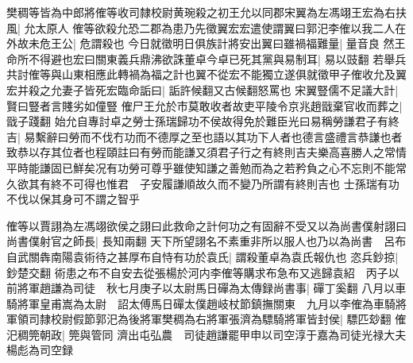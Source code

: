 樊稠等皆為中郎將傕等收司隸校尉黄琬殺之初王允以同郡宋翼為左馮翊王宏為右扶風|{
	允太原人}
傕等欲殺允恐二郡為患乃先徵翼宏宏遣使謂翼曰郭汜李傕以我二人在外故未危王公|{
	危謂殺也}
今日就徵明日俱族計將安出翼曰雖禍福難量|{
	量音良}
然王命所不得避也宏曰關東義兵鼎沸欲誅董卓今卓已死其黨與易制耳|{
	易以豉翻}
若舉兵共討傕等與山東相應此轉禍為福之計也翼不從宏不能獨立遂俱就徵甲子傕收允及翼宏并殺之允妻子皆死宏臨命詬曰|{
	詬許候翻又古候翻怒罵也}
宋翼豎儒不足議大計|{
	賢曰豎者言賤劣如僮豎}
傕尸王允於市莫敢收者故吏平陵令京兆趙戩棄官收而葬之|{
	戩子踐翻}
始允自專討卓之勞士孫瑞歸功不侯故得免於難臣光曰易稱勞謙君子有終吉|{
	易繫辭曰勞而不伐冇功而不德厚之至也語以其功下人者也德言盛禮言恭謙也者致恭以存其位者也程頤註曰有勞而能謙又須君子行之有終則吉夫樂高喜勝人之常情平時能謙固已鮮矣况有功勞可尊乎雖使知謙之善勉而為之若矜負之心不忘則不能常久欲其有終不可得也惟君　子安履謙順故久而不變乃所謂有終則吉也}
士孫瑞有功不伐以保其身可不謂之智乎

傕等以賈詡為左馮翊欲侯之詡曰此救命之計何功之有固辭不受又以為尚書僕射詡曰尚書僕射官之師長|{
	長知兩翻}
天下所望詡名不素重非所以服人也乃以為尚書　呂布自武關犇南陽袁術待之甚厚布自恃有功於袁氏|{
	謂殺董卓為袁氏報仇也}
恣兵鈔掠|{
	鈔楚交翻}
術患之布不自安去從張楊於河内李傕等購求布急布又逃歸袁紹　丙子以前將軍趙謙為司徒　秋七月庚子以太尉馬日磾為太傳録尚書事|{
	磾丁奚翻}
八月以車騎將軍皇甫嵩為太尉　詔太傅馬日磾太僕趙岐杖節鎮撫關東　九月以李傕為車騎將軍領司隸校尉假節郭汜為後將軍樊稠為右將軍張濟為驃騎將軍皆封侯|{
	驃匹玅翻}
傕汜稠筦朝政|{
	筦與管同}
濟出屯弘農　司徒趙謙罷甲申以司空淳于嘉為司徒光禄大夫楊彪為司空録

